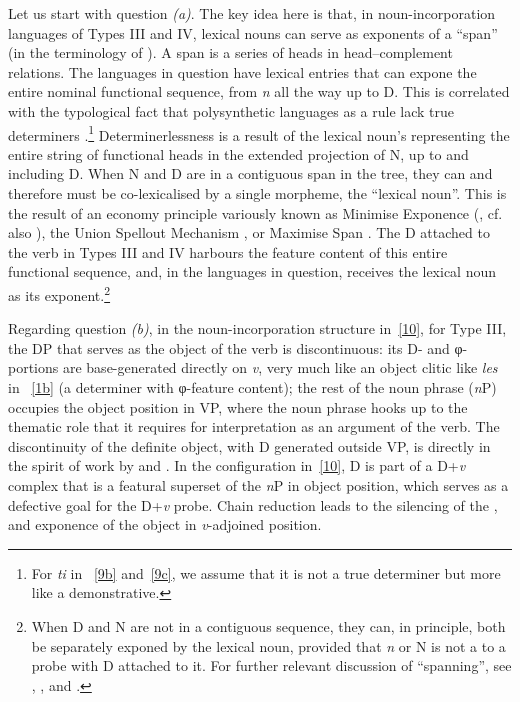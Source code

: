\documentclass[output=paper]{langsci/langscibook}
\begin{document}
\begin{refcontext}
\vspace{1ex}

Let us start with question \emph{(a)}. The key idea here is that, in
noun-incorporation languages of Types III and IV, lexical nouns can serve as
exponents of a \enquote{span} (in the terminology of ).  A span is a
series of heads in head--complement relations. The languages in question have
lexical entries that can expone the entire nominal functional sequence, from
\emph{n} all the way up to D.  This is correlated with the typological fact
that polysynthetic languages as a rule lack true determiners
\citep{baker96}.\footnote{For \emph{ti} in ~\eqref{9b} and~\eqref{9c}, we
assume that it is not a true determiner but more like a demonstrative.}
Determinerlessness is a result of the lexical noun's representing the entire
string of functional heads in the extended projection of N, up to and including
D. When N and D are in a contiguous span in the tree, they can and therefore
must be co-lexicalised by a single morpheme, the \enquote{lexical noun}. This is the
result of an economy principle variously known as Minimise Exponence
(\citealt{siddiqi}, cf. also \citealt{noyer93}), the Union Spellout Mechanism
\citep{muriungiunionspo}, or Maximise Span \citep{pantchevalocationsourcegoal}.
The D attached to the verb in Types III and IV harbours the feature content of
this entire functional sequence, and, in the languages in question, receives
the lexical noun as its exponent.\footnote{When D and N are not in a contiguous
    sequence, they can, in principle, both be separately exponed by the lexical
    noun, provided that \emph{n} or N is not a  to a probe with D
attached to it. For further relevant discussion of \enquote{spanning}, see
\cite{ramchand08}, \cite{taraldnguni}, \cite{merchant15} and
\cite{svenonius16}.}

Regarding question \emph{(b)}, in the noun-incorporation structure
in~\eqref{10}, for Type III, the DP that serves as the object of the verb is
discontinuous: its D- and φ{}-portions are base-generated directly on \emph{v},
very much like an object clitic like \emph{les} in ~\eqref{1b} (a
determiner with φ-feature content); the rest of the noun phrase (\emph{n}P)
occupies the object position in VP, where the noun phrase hooks up to the
thematic role that it requires for interpretation as an argument of the verb.
The discontinuity of the definite object, with D generated outside VP, is
directly in the spirit of work by \cite{sportiche98} and \cite{lin00}. In the
configuration in~\eqref{10}, D is part of a D+\emph{v} complex that is a
featural superset of the \emph{n}P in object position, which serves as a
defective goal for the D+\emph{v} probe.  Chain reduction leads to the
silencing of the , and exponence of the object in
\emph{v}-adjoined position.


\end{refcontext}
\end{document}
